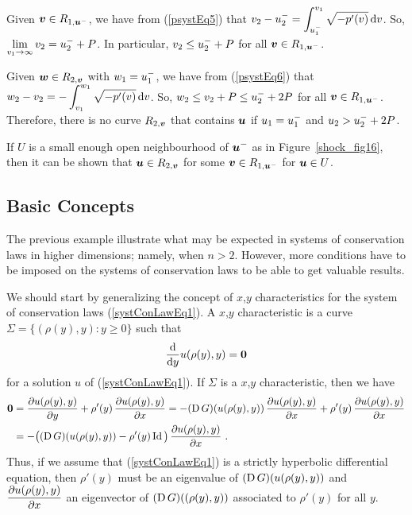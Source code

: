 \begin{egg}
Given $\VEC{v} \in R_{1,\VEC{u}^-}$, we have from (\ref{psystEq5}) that
$\DS v_2 - u_2^- = \int_{u_1^-}^{v_1} \sqrt{-p'(v)} \dx{v}$.
So, $\DS \lim_{v_1 \to \infty} v_2 = u_2^- + P$.  In
particular, $\DS v_2 \leq u_2^- + P$ for all
$\VEC{v} \in R_{1,\VEC{u}^-}$.

Given $\VEC{w} \in R_{2,\VEC{v}}$ with $\DS w_1 = u_1^-$, we have from
(\ref{psystEq6}) that
$\DS w_2 - v_2 = -\int_{v_1}^{w_1} \sqrt{-p'(v)} \dx{v}$.
So, $\DS w_2 \leq v_2 + P \leq u_2^- + 2P$ for all
$\VEC{v} \in R_{1,\VEC{u}^-}$.
Therefore, there is no curve $R_{2,\VEC{v}}$ that contains $\VEC{u}$ if
$\DS u_1 = u_1^-$ and $\DS u_2 > u_2^- + 2 P$.


If $U$ is a small enough open neighbourhood of $\DS \VEC{u}^-$ as in
Figure~\ref{shock_fig16}, then it can be shown that
$\VEC{u} \in R_{2,\VEC{v}}$ for some $\VEC{v} \in R_{1,\VEC{u}^-}$
for $\VEC{u} \in U$.
\end{egg}

\subsection{Basic Concepts}

The previous example illustrate what may be expected in systems of
conservation laws in higher dimensions; namely, when $n>2$.  However,
more conditions have to be imposed on the systems of conservation laws
to be able to get valuable results.

We should start by generalizing the concept of $x$,$y$ characteristics
for the system of conservation laws (\ref{systConLawEq1}).
A $x$,$y$ characteristic is a curve
$\Sigma = \{ (\rho(y),y) : y \geq 0 \}$ such that
\[
  \dfdx{u(\rho(y),y)}{y} = \VEC{0}
\]
for a solution $u$ of (\ref{systConLawEq1}).  If $\Sigma$ is a $x$,$y$
characteristic, then we have
\begin{align*}
\VEC{0} &= \pdydx{u(\rho(y),y)}{y} + \rho'(y)\, \pdydx{u(\rho(y),y)}{x} 
= -(\diff G)(u(\rho(y),y))\, \pdydx{u(\rho(y),y)}{x}
+ \rho'(y)\, \pdydx{u(\rho(y),y)}{x} \\
&= -\big( (\diff G)(u(\rho(y),y)) - \rho'(y) \Id \big)\,
\pdydx{u(\rho(y),y)}{x} \ .
\end{align*}
Thus, if we assume that (\ref{systConLawEq1}) is a strictly hyperbolic
differential equation, then $\rho'(y)$ must be an eigenvalue of
$(\diff G)(u(\rho(y),y))$ and $\DS \pdydx{u(\rho(y),y)}{x}$
an eigenvector of $(\diff G)((\rho(y),y))$ associated to $\rho'(y)$
for all $y$.

